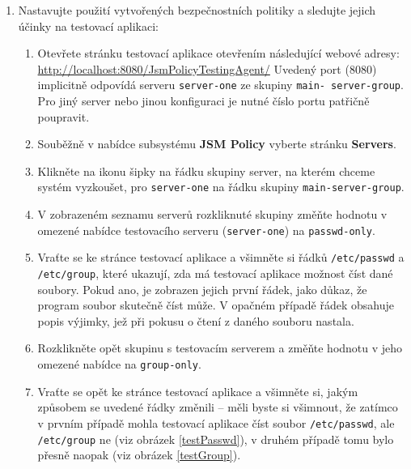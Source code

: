 \begin{enumerate}
  \item Nastavujte použití vytvořených bezpečnostních politiky a sledujte jejich účinky na testovací aplikaci:
  \begin{enumerate}
    \item Otevřete stránku testovací aplikace otevřením následující webové adresy:
      \newline\url{http://localhost:8080/JsmPolicyTestingAgent/}\newline
      Uvedený port (8080) implicitně odpovídá serveru {\tt server-one} ze skupiny {\tt main- server-group}. Pro jiný server nebo jinou konfiguraci je nutné číslo portu patřičně poupravit.
    \item Souběžně v nabídce subsystému {\bf JSM Policy} vyberte stránku {\bf Servers}.
    \item Klikněte na ikonu šipky na řádku skupiny server, na kterém chceme systém vyzkoušet, pro {\tt server-one} na řádku skupiny {\tt main-server-group}.
    \item V zobrazeném seznamu serverů rozkliknuté skupiny změňte hodnotu v omezené nabídce testovacího serveru ({\tt server-one}) na {\tt passwd-only}.
    \item Vraťte se ke stránce testovací aplikace a všimněte si řádků {\tt /etc/passwd} a {\tt /etc/group}, které ukazují, zda má testovací aplikace možnost číst dané soubory. Pokud ano, je zobrazen jejich první řádek, jako důkaz, že program soubor skutečně číst může. V opačném případě řádek obsahuje popis výjimky, jež při pokusu o čtení z daného souboru nastala.
    \item Rozklikněte opět skupinu s testovacím serverem a změňte hodnotu v jeho omezené nabídce na {\tt group-only}.
    \item Vraťte se opět ke stránce testovací aplikace a všimněte si, jakým způsobem se uvedené řádky změnili -- měli byste si všimnout, že zatímco v prvním případě mohla testovací aplikace číst soubor {\tt /etc/passwd}, ale {\tt /etc/group} ne (viz obrázek \ref{testPasswd}), v druhém případě tomu bylo přesně naopak (viz obrázek \ref{testGroup}).
  \end{enumerate}
\end{enumerate}

